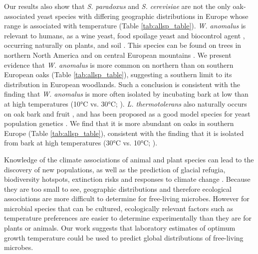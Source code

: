 \documentclass[12pt]{article}
\begin{document}
\begin{linenumbers}
Our results also show that \textit{S. paradoxus} and \textit{S. cerevisiae} are not the only oak-associated yeast species with differing geographic distributions in Europe whose range is associated with temperature (Table \ref{tab:allsp_table}). \textit{W. anomalus} is relevant to humans, as a wine yeast, food spoilage yeast and biocontrol agent \citep{passoth_biotechnology_2006}, occurring naturally on plants, and soil \citep{kurtzman_chapter_2011-2}. This species can be found on trees in northern North America \citep{charron_exploring_2014,sylvester_temperature_2015} and on central European mountains \citep{slavikova_yeasts_2007}. We present evidence that \textit{W. anomalus} is more common on northern than on southern European oaks (Table \ref{tab:allsp_table}), suggesting a southern limit to its distribution in European woodlands. Such a conclusion is consistent with the finding that \textit{W. anomalus} is more often isolated by incubating bark at low than at high temperatures (10\si{\degreeCelsius} vs. 30\si{\degreeCelsius}; \citealp{sylvester_temperature_2015}). \textit{L. thermotolerans} also naturally occurs on oak bark \citep{sampaio_natural_2008,charron_exploring_2014,sylvester_temperature_2015,freel_lachancea_2015} and fruit \citep{lachance_chapter_2011}, and has been proposed as a good model species for yeast population genetics \citep{freel_population_2014,freel_lachancea_2015}. We find that it is more abundant on oaks in southern Europe (Table \ref{tab:allsp_table}), consistent with the finding that it is isolated from bark at high temperatures (30\si{\degreeCelsius} vs. 10\si{\degreeCelsius}; \citealp{sylvester_temperature_2015}).

Knowledge of the climate associations of animal and plant species can lead to the discovery of new populations, as well as the prediction of glacial refugia, biodiversity hotspots, extinction risks and responses to climate change \citep{araujo_uses_2012,jarnevich_caveats_2015}. Because they are too small to see, geographic distributions and therefore ecological associations are more difficult to determine for free-living microbes. However for microbial species that can be cultured, ecologically relevant factors such as temperature preferences are easier to determine experimentally than they are for plants or animals. Our work suggests that laboratory estimates of optimum growth temperature could be used to predict global distributions of free-living microbes.


\clearpage




\end{linenumbers}
\end{document}
